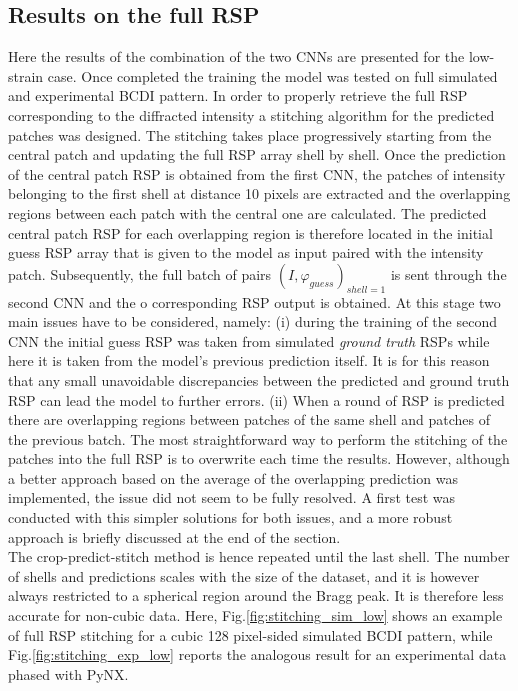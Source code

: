 \subsection{Results on the full RSP}

Here the results of the combination of the two CNNs are presented for the low-strain case. Once completed the training 
the model was tested on full simulated and experimental BCDI pattern. In order to properly retrieve the full RSP corresponding 
to the diffracted intensity a stitching algorithm for the predicted patches was designed. The stitching takes place
progressively starting from the central patch and updating the full RSP array shell by shell. Once the prediction of the 
central patch RSP is obtained from the first CNN, the patches of intensity belonging to the first shell at distance 10 pixels 
are extracted and the overlapping regions between each patch with the central one are calculated. The predicted central patch RSP 
for each overlapping region is therefore located in the initial guess RSP array that is given to the model as input paired with 
the intensity patch. Subsequently, the full batch of pairs $(I,\varphi_{guess})_{shell = 1}$ is sent through the second CNN and the o
corresponding RSP output is obtained. 
At this stage two main issues have to be considered, namely: (i) during the training of the 
second CNN the initial guess RSP was taken from simulated \textit{ground truth} RSPs while here it is taken from the model's 
previous prediction itself. It is for this reason that any small unavoidable discrepancies between the predicted and 
ground truth RSP can lead the model to further errors. (ii) When a round of RSP is predicted there are overlapping 
regions between patches of the same shell and patches of the previous batch. The most straightforward way to perform the 
stitching of the patches into the full RSP is to overwrite each time the results. However, although a better approach based on 
the average of the overlapping prediction was implemented, the issue did not seem to be fully resolved.
A first test was conducted with this simpler solutions for both issues, and a more robust approach is briefly discussed 
at the end of the section. \\

The crop-predict-stitch method is hence repeated until the last shell. The number of shells and predictions scales with 
the size of the dataset, and it is however always restricted to a spherical region around the Bragg peak. It is therefore 
less accurate for non-cubic data. 
Here, Fig.\ref{fig:stitching_sim_low} shows an example of full RSP stitching for a cubic 128 pixel-sided simulated BCDI 
pattern, while Fig.\ref{fig:stitching_exp_low} reports the analogous result for an experimental data phased with PyNX. 

